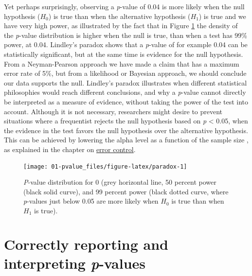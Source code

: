 \documentclass[
  oneside]{krantz}
\begin{document}
Yet perhaps surprisingly, observing a \emph{p}-value of 0.04 is more likely when the null hypothesis (\(H_0\)) is true than when the alternative hypothesis (\(H_1\)) is true and we have very high power, as illustrated by the fact that in Figure \ref{fig:paradox} the density of the \emph{p}-value distribution is higher when the null is true, than when a test has 99\% power, at 0.04. Lindley's paradox shows that a \emph{p}-value of for example 0.04 can be statistically significant, but at the same time is evidence for the null hypothesis. From a Neyman-Pearson approach we have made a claim that has a maximum error rate of 5\%, but from a likelihood or Bayesian approach, we should conclude our data supports the null. Lindley's paradox illustrates when different statistical philosophies would reach different conclusions, and why a \emph{p}-value cannot directly be interpreted as a measure of evidence, without taking the power of the test into account. Although it is not necessary, researchers might desire to prevent situations where a frequentist rejects the null hypothesis based on \emph{p} \textless{} 0.05, when the evidence in the test favors the null hypothesis over the alternative hypothesis. This can be achieved by lowering the alpha level as a function of the sample size \citep{leamer_specification_1978, maier_justify_2022, good_bayesnon-bayes_1992}, as explained in the chapter on \protect\hyperlink{errorcontrol}{error control}.



\begin{figure}

{\centering \texttt{[image: 01-pvalue\_files/figure-latex/paradox-1]} 

}

\caption{\emph{P}-value distribution for 0 (grey horizontal line, 50 percent power (black solid curve), and 99 percent power (black dotted curve, where \emph{p}-values just below 0.05 are more likely when \(H_0\) is true than when \(H_1\) is true).}\label{fig:paradox}
\end{figure}

\hypertarget{correctly-reporting-and-interpreting-p-values}{%
\section{\texorpdfstring{Correctly reporting and interpreting \emph{p}-values}{Correctly reporting and interpreting p-values}}\label{correctly-reporting-and-interpreting-p-values}}
\end{document}
